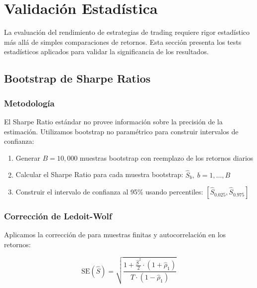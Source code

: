 
\section{Validaci\'on Estad\'istica}
\label{sec:statistical_validation}

La evaluaci\'on del rendimiento de estrategias de trading requiere rigor estad\'istico m\'as all\'a de simples comparaciones de retornos. Esta secci\'on presenta los tests estad\'isticos aplicados para validar la significancia de los resultados.

\subsection{Bootstrap de Sharpe Ratios}
\label{subsec:bootstrap_sharpe}

\subsubsection{Metodolog\'ia}

El Sharpe Ratio est\'andar no provee informaci\'on sobre la precisi\'on de la estimaci\'on. Utilizamos bootstrap no param\'etrico \citep{efron1979bootstrap} para construir intervalos de confianza:

\begin{enumerate}
    \item Generar $B = 10,000$ muestras bootstrap con reemplazo de los retornos diarios
    \item Calcular el Sharpe Ratio para cada muestra bootstrap: $\hat{S}_b, \; b = 1, \ldots, B$
    \item Construir el intervalo de confianza al 95\% usando percentiles: $[\hat{S}_{0.025}, \hat{S}_{0.975}]$
\end{enumerate}

\subsubsection{Correcci\'on de Ledoit-Wolf}

Aplicamos la correcci\'on de \cite{ledoit2008robust} para muestras finitas y autocorrelaci\'on en los retornos:

\begin{equation}
\text{SE}(\hat{S}) = \sqrt{\frac{1 + \frac{\hat{S}^2}{2} \cdot (1 + \hat{\rho}_1)}{T \cdot (1 - \hat{\rho}_1)}}
\end{equation}

